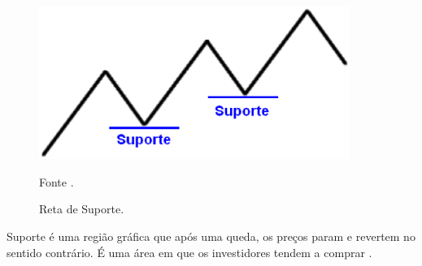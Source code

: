 \begin{figure}
\centering
\includegraphics[width=0.9\textwidth]{figuras/retaSuporte}
\caption{Reta de Suporte.}{Fonte .}
\label{retaSuporte}
\end{figure}

Suporte é uma região gráfica que após uma queda, os preços param e revertem no sentido contrário. É uma área em que os investidores tendem a comprar \cite[p~97]{debastini2008}.

